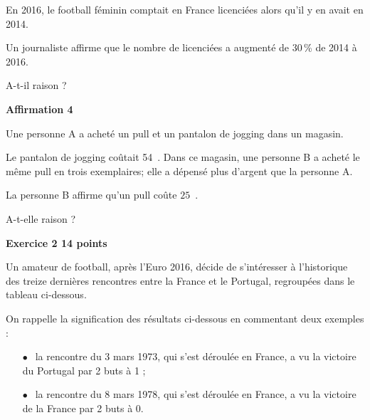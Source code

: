 \documentclass[10pt]{article}
\newcommand{\euro}{\eurologo{}}
\begin{document}
En 2016, le football féminin comptait en France  licenciées alors qu'il y en avait  en 2014.

Un journaliste affirme que le nombre de licenciées a augmenté de $30$\,\% de 2014 à
2016.

A-t-il raison ?

\medskip

\textbf{Affirmation 4}

\smallskip

Une personne A a acheté un pull et un pantalon de jogging dans un magasin.

Le pantalon de jogging coûtait 54~\euro. Dans ce magasin, une personne B a acheté le
même pull en trois exemplaires; elle a dépensé plus d'argent que la personne A.

La personne B affirme qu'un pull coûte $25$~\euro.

A-t-elle raison ?

\bigskip

\textbf{Exercice 2 \hfill 14 points}

\medskip

Un amateur de football, après l'Euro 2016, décide de s'intéresser à l'historique des
treize dernières rencontres entre la France et le Portugal, regroupées dans le tableau
ci-dessous.

On rappelle la signification des résultats ci-dessous en commentant deux exemples :

\setlength\parindent{6mm}
\begin{itemize}
\item[$\bullet~~$]la rencontre du 3 mars 1973, qui s'est déroulée en France, a vu la victoire du Portugal par 2 buts à 1 ;
\item[$\bullet~~$]la rencontre du 8 mars 1978, qui s'est déroulée en France, a vu la victoire de la France par 2 buts à 0.
\end{itemize}
\setlength\parindent{0mm}
\end{document}
